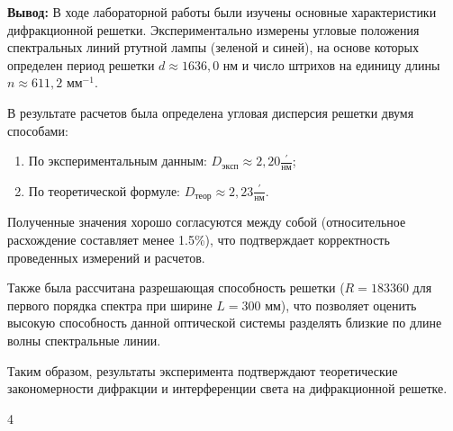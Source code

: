 \documentclass[a4paper,12pt]{article}
\begin{document}
\noindent \textbf{Вывод:} В ходе лабораторной работы были изучены основные характеристики дифракционной решетки. Экспериментально измерены угловые положения спектральных линий ртутной лампы (зеленой и синей), на основе которых определен период решетки $d \approx 1636,0$ нм и число штрихов на единицу длины $n \approx 611,2 \text{ мм}^{-1}$.

\medskip
В результате расчетов была определена угловая дисперсия решетки двумя способами:
\begin{enumerate}
    \item По экспериментальным данным: $D_{эксп} \approx 2,20 \frac{'}{\text{нм}}$;
    \item По теоретической формуле: $D_{теор} \approx 2,23 \frac{'}{\text{нм}}$.
\end{enumerate}
Полученные значения хорошо согласуются между собой (относительное расхождение составляет менее 1.5\%), что подтверждает корректность проведенных измерений и расчетов.

\medskip
Также была рассчитана разрешающая способность решетки ($R = 183360$ для первого порядка спектра при ширине $L = 300$ мм), что позволяет оценить высокую способность данной оптической системы разделять близкие по длине волны спектральные линии.

\medskip
Таким образом, результаты эксперимента подтверждают теоретические закономерности дифракции и интерференции света на дифракционной решетке.

\vfill
\begin{flushright}
    4
\end{flushright}
\end{document}
